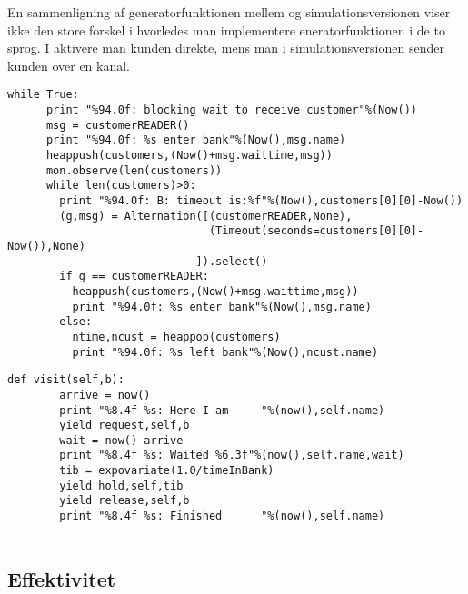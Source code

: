 En sammenligning af generatorfunktionen mellem \simpy og simulationsversionen viser ikke den store forskel i hvorledes  man  implementere eneratorfunktionen i de to sprog. I \simpy aktivere man kunden direkte, mens man i simulationsversionen sender kunden over en kanal.

\begin{lstlisting}[firstnumber=39,float=hbtp, label=fig:simulation_bank, caption= Uddrag af bank processen i simulation]
    while True:
      print "%94.0f: blocking wait to receive customer"%(Now())
      msg = customerREADER()
      print "%94.0f: %s enter bank"%(Now(),msg.name)
      heappush(customers,(Now()+msg.waittime,msg))
      mon.observe(len(customers))
      while len(customers)>0:
        print "%94.0f: B: timeout is:%f"%(Now(),customers[0][0]-Now())
        (g,msg) = Alternation([(customerREADER,None),
                               (Timeout(seconds=customers[0][0]- Now()),None)
                             ]).select()
        if g == customerREADER:
          heappush(customers,(Now()+msg.waittime,msg))
          print "%94.0f: %s enter bank"%(Now(),msg.name)
        else:
          ntime,ncust = heappop(customers)
          print "%94.0f: %s left bank"%(Now(),ncust.name) 
\end{lstlisting}

\begin{lstlisting}[firstnumber=20 ,float=hbtp, label=fig:simpy_customer, caption=funktionen \code{visit} i \simpy]
     def visit(self,b):                                
        arrive = now()
        print "%8.4f %s: Here I am     "%(now(),self.name)
        yield request,self,b                          
        wait = now()-arrive
        print "%8.4f %s: Waited %6.3f"%(now(),self.name,wait)
        tib = expovariate(1.0/timeInBank)            
        yield hold,self,tib                          
        yield release,self,b                         
        print "%8.4f %s: Finished      "%(now(),self.name)
 
\end{lstlisting}

  
\subsection{Effektivitet}  

